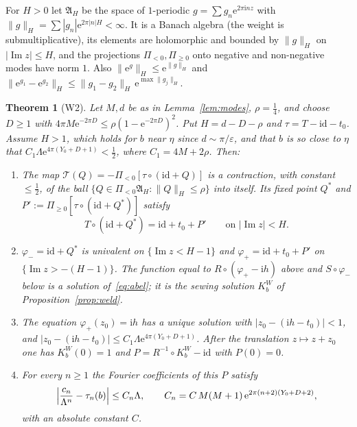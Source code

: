 \documentclass[11pt,a4paper]{article}
\newtheorem{theorem}{Theorem}
\theoremstyle{definition}
\newcommand{\Rr}{R}
\newcommand{\Kk}{K}
\newcommand{\eee}{\mathrm{e}}
\newcommand{\ii}{\mathrm{i}}
\begin{document}
For $H>0$ let $\mathfrak A_H$ be the space of $1$-periodic
$g=\sum g_n\eee^{2\pi\ii nz}$ with
$\|g\|_H=\sum|g_n|\eee^{2\pi|n|H}<\infty$.  It is a Banach algebra
(the weight is submultiplicative), its elements are holomorphic and bounded by
$\|g\|_H$ on $|\operatorname{Im}z|\le H$, and the projections
$\Pi_{<0},\Pi_{\ge0}$ onto negative and non-negative modes have norm $1$.  Also
$\|\eee^{g}\|_H\le\eee^{\|g\|_H}$ and
$\|\eee^{g_1}-\eee^{g_2}\|_H\le\|g_1-g_2\|_H\,\eee^{\max\|g_j\|_H}$.

\begin{theorem}[W2]\label{thm:W2}
Let $M,d$ be as in Lemma~\ref{lem:modes}, $\rho=\tfrac14$, and choose $D\ge1$
with $4\pi M\eee^{-2\pi D}\le\rho(1-\eee^{-2\pi D})^2$.  Put $H=d-D-\rho$ and
$\tau=T-\mathrm{id}-t_0$.  Assume $H>1$, which holds for $b$ near $\eta$ since
$d\sim\pi/\varepsilon$, and that $b$ is so close to $\eta$ that
$C_1\Lambda\eee^{4\pi(Y_0+D+1)}<\tfrac12$, where $C_1=4M+2\rho$.  Then:
\begin{enumerate}
\item The map $\mathcal T(Q)=-\Pi_{<0}[\tau\circ(\mathrm{id}+Q)]$ is a
  contraction, with constant $\le\tfrac12$, of the ball
  $\{Q\in\Pi_{<0}\mathfrak A_H:\|Q\|_H\le\rho\}$ into itself.  Its fixed point
  $Q^*$ and $P':=\Pi_{\ge0}[\tau\circ(\mathrm{id}+Q^*)]$ satisfy
  \[
   T\circ(\mathrm{id}+Q^*)=\mathrm{id}+t_0+P'\qquad\text{on }|\operatorname{Im}z|<H.
  \]
\item $\varphi_-=\mathrm{id}+Q^*$ is univalent on $\{\operatorname{Im}z<H-1\}$
  and $\varphi_+=\mathrm{id}+t_0+P'$ on $\{\operatorname{Im}z>-(H-1)\}$.  The
  function equal to $\Rr\circ(\varphi_+-\ii h)$ above and $S\circ\varphi_-$ below
  is a solution of~\eqref{eq:abel}; it is the sewing solution $\Kk^W_b$ of
  Proposition~\ref{prop:weld}.
\item The equation $\varphi_+(z_0)=\ii h$ has a unique solution with
  $|z_0-(\ii h-t_0)|<1$, and $|z_0-(\ii h-t_0)|\le C_1\Lambda\eee^{4\pi(Y_0+D+1)}$.
  After the translation $z\mapsto z+z_0$ one has $\Kk^W_b(0)=1$ and
  $P=\Rr^{-1}\circ\Kk^W_b-\mathrm{id}$ with $P(0)=0$.
\item For every $n\ge1$ the Fourier coefficients of this $P$ satisfy
  \[
   \Bigl|\frac{c_n}{\Lambda^n}-\tau_n(b)\Bigr|\le C_n\Lambda,
   \qquad C_n=C\,M(M+1)\,\eee^{2\pi(n+2)(Y_0+D+2)},
  \]
  with an absolute constant $C$.
\end{enumerate}
\end{theorem}
\end{document}
